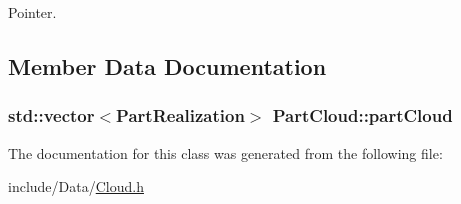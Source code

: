 Pointer. 



\subsection{Member Data Documentation}
\hypertarget{class_part_cloud_a22d75c4d769cbf7223c429809de20641}{
\subsubsection[{part\-Cloud}]{\setlength{\rightskip}{0pt plus 5cm}std\-::vector$<${\bf Part\-Realization}$>$ Part\-Cloud\-::part\-Cloud}}\label{class_part_cloud_a22d75c4d769cbf7223c429809de20641}


The documentation for this class was generated from the following file\-:\begin{DoxyCompactItemize}
\item 
include/\-Data/\hyperlink{_cloud_8h}{Cloud.\-h}\end{DoxyCompactItemize}
